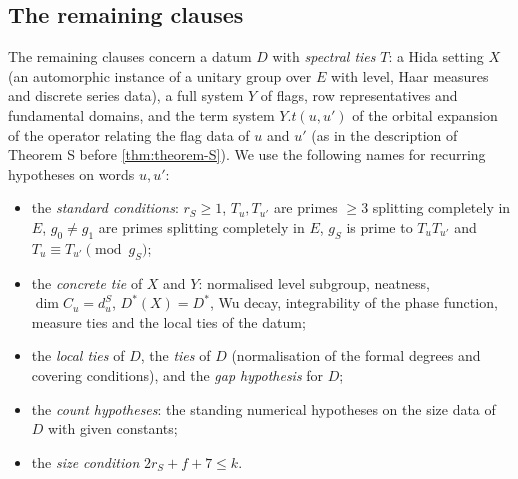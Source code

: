 \subsection{The remaining clauses}\label{pf:thmS-leaves:ss:remaining}

The remaining clauses concern a datum $D$ with \emph{spectral ties} $T$: a Hida setting $X$ (an automorphic instance of a
unitary group over $E$ with level, Haar measures and discrete series data), a full system $Y$ of flags, row representatives
and fundamental domains, and the term system $Y.t(u,u')$ of the orbital expansion of the operator relating the flag data of
$u$ and $u'$ (as in the description of Theorem S before \cref{thm:theorem-S}). We use the following names for recurring
hypotheses on words $u,u'$:
\begin{itemize}
\item the \emph{standard conditions}: $r_S\ge1$, $T_u,T_{u'}$ are primes $\ge3$ splitting completely in $E$, $g_0\ne g_1$ are primes
splitting completely in $E$, $g_S$ is prime to $T_uT_{u'}$ and $T_u\equiv T_{u'}\pmod{g_S}$;
\item the \emph{concrete tie} of $X$ and $Y$: normalised level subgroup, neatness, $\dim C_u=d^S_u$, $D^*(X)=D^*$, Wu decay,
integrability of the phase function, measure ties and the local ties of the datum;
\item the \emph{local ties} of $D$, the \emph{ties} of $D$ (normalisation of the formal degrees and covering conditions), and the
\emph{gap hypothesis} for $D$;
\item the \emph{count hypotheses}: the standing numerical hypotheses on the size data of $D$ with given constants;
\item the \emph{size condition} $2r_S+f+7\le k$.
\end{itemize}

